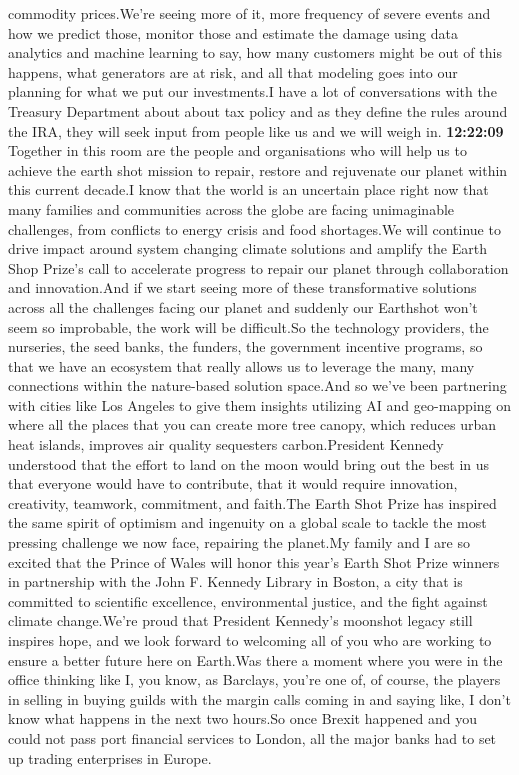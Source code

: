\documentclass{article}%
\begin{document}
commodity prices.We're seeing more of it, more frequency of severe events and how we predict those, monitor those and estimate the damage using data analytics and machine learning to say, how many customers might be out of this happens, what generators are at risk, and all that modeling goes into our planning for what we put our investments.I have a lot of conversations with the Treasury Department about about tax policy and as they define the rules around the IRA, they will seek input from people like us and we will weigh in.%
\textbf{12:22:09}%
\newline%
Together in this room are the people and organisations who will help us to achieve the earth shot mission to repair, restore and rejuvenate our planet within this current decade.I know that the world is an uncertain place right now that many families and communities across the globe are facing unimaginable challenges, from conflicts to energy crisis and food shortages.We will continue to drive impact around system changing climate solutions and amplify the Earth Shop Prize's call to accelerate progress to repair our planet through collaboration and innovation.And if we start seeing more of these transformative solutions across all the challenges facing our planet and suddenly our Earthshot won't seem so improbable, the work will be difficult.So the technology providers, the nurseries, the seed banks, the funders, the government incentive programs, so that we have an ecosystem that really allows us to leverage the many, many connections within the nature{-}based solution space.And so we've been partnering with cities like Los Angeles to give them insights utilizing AI and geo{-}mapping on where all the places that you can create more tree canopy, which reduces urban heat islands, improves air quality sequesters carbon.President Kennedy understood that the effort to land on the moon would bring out the best in us that everyone would have to contribute, that it would require innovation, creativity, teamwork, commitment, and faith.The Earth Shot Prize has inspired the same spirit of optimism and ingenuity on a global scale to tackle the most pressing challenge we now face, repairing the planet.My family and I are so excited that the Prince of Wales will honor this year's Earth Shot Prize winners in partnership with the John F. Kennedy Library in Boston, a city that is committed to scientific excellence, environmental justice, and the fight against climate change.We're proud that President Kennedy's moonshot legacy still inspires hope, and we look forward to welcoming all of you who are working to ensure a better future here on Earth.Was there a moment where you were in the office thinking like I, you know, as Barclays, you're one of, of course, the players in selling in buying guilds with the margin calls coming in and saying like, I don't know what happens in the next two hours.So once Brexit happened and you could not pass port financial services to London, all the major banks had to set up trading enterprises in Europe.%
\end{document}
